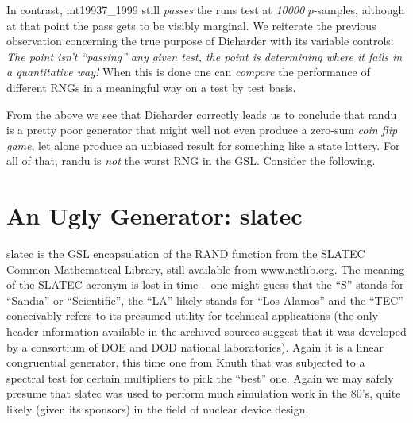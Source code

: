\documentclass[12pt]{book}
\begin{document}
In contrast, mt19937\_1999 still {\em passes} the runs test at {\em
10000} $p$-samples, although at that point the pass gets to be visibly
marginal.  We reiterate the previous observation concerning the true
purpose of Dieharder with its variable controls: {\em The point isn't
``passing'' any given test, the point is determining where it fails in a
quantitative way!} When this is done one can {\em compare} the
performance of different RNGs in a meaningful way on a test by test
basis.

From the above we see that Dieharder correctly leads us to conclude that
randu is a pretty poor generator that might well not even produce a
zero-sum {\em coin flip game}, let alone produce an unbiased result for
something like a state lottery.  For all of that, randu is {\em not} the
worst RNG in the GSL.  Consider the following.

\section{An Ugly Generator: slatec}

slatec is the GSL encapsulation of the RAND function from the SLATEC
Common Mathematical Library, still available from
www.netlib.org\cite{slatec}.  The meaning of the SLATEC acronym is lost
in time -- one might guess that the ``S'' stands for ``Sandia'' or
``Scientific'', the ``LA'' likely stands for ``Los Alamos'' and the
``TEC'' conceivably refers to its presumed utility for technical
applications (the only header information available in the archived
sources suggest that it was developed by a consortium of DOE and DOD
national laboratories).  Again it is a linear congruential generator,
this time one from Knuth that was subjected to a spectral test for
certain multipliers to pick the ``best'' one.  Again we may safely
presume that slatec was used to perform much simulation work in the
80's, quite likely (given its sponsors) in the field of nuclear device
design.
\end{document}
